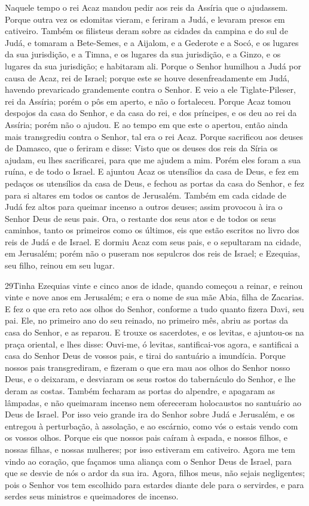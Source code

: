 Naquele tempo o rei Acaz mandou pedir aos reis da Assíria que o
ajudassem. Porque outra vez os edomitas vieram, e feriram a
Judá, e levaram presos em cativeiro. Também os filisteus
deram sobre as cidades da campina e do sul de Judá, e tomaram a
Bete-Semes, e a Aijalom, e a Gederote e a Socó, e os lugares da sua
jurisdição, e a Timna, e os lugares da sua jurisdição, e a Ginzo, e
os lugares da sua jurisdição; e habitaram ali. Porque o
Senhor humilhou a Judá por causa de Acaz, rei de Israel; porque este
se houve desenfreadamente em Judá, havendo prevaricado grandemente
contra o Senhor. E veio a ele Tiglate-Pileser, rei da
Assíria; porém o pôs em aperto, e não o fortaleceu. Porque
Acaz tomou despojos da casa do Senhor, e da casa do rei, e dos
príncipes, e os deu ao rei da Assíria; porém não o ajudou. E
ao tempo em que este o apertou, então ainda mais transgrediu contra
o Senhor, tal era o rei Acaz. Porque sacrificou aos deuses de
Damasco, que o feriram e disse: Visto que os deuses dos reis da
Síria os ajudam, eu lhes sacrificarei, para que me ajudem a mim.
Porém eles foram a sua ruína, e de todo o Israel. E ajuntou
Acaz os utensílios da casa de Deus, e fez em pedaços os utensílios
da casa de Deus, e fechou as portas da casa do Senhor, e fez para si
altares em todos os cantos de Jerusalém. Também em cada
cidade de Judá fez altos para queimar incenso a outros deuses; assim
provocou à ira o Senhor Deus de seus pais. Ora, o restante
dos seus atos e de todos os seus caminhos, tanto os primeiros como
os últimos, eis que estão escritos no livro dos reis de Judá e de
Israel. E dormiu Acaz com seus pais, e o sepultaram na
cidade, em Jerusalém; porém não o puseram nos sepulcros dos reis de
Israel; e Ezequias, seu filho, reinou em seu lugar.

\medskip

\lettrine{29} Tinha Ezequias vinte e cinco anos de idade,
quando começou a reinar, e reinou vinte e nove anos em Jerusalém; e
era o nome de sua mãe Abia, filha de Zacarias. E fez o que era
reto aos olhos do Senhor, conforme a tudo quanto fizera Davi, seu
pai. Ele, no primeiro ano do seu reinado, no primeiro mês, abriu
as portas da casa do Senhor, e as reparou. E trouxe os
sacerdotes, e os levitas, e ajuntou-os na praça oriental, e lhes
disse: Ouvi-me, ó levitas, santificai-vos agora, e santificai a casa
do Senhor Deus de vossos pais, e tirai do santuário a imundícia.
Porque nossos pais transgrediram, e fizeram o que era mau aos
olhos do Senhor nosso Deus, e o deixaram, e desviaram os seus rostos
do tabernáculo do Senhor, e lhe deram as costas. Também fecharam
as portas do alpendre, e apagaram as lâmpadas, e não queimaram
incenso nem ofereceram holocaustos no santuário ao Deus de Israel.
Por isso veio grande ira do Senhor sobre Judá e Jerusalém, e os
entregou à perturbação, à assolação, e ao escárnio, como vós o
estais vendo com os vossos olhos. Porque eis que nossos pais
caíram à espada, e nossos filhos, e nossas filhas, e nossas
mulheres; por isso estiveram em cativeiro. Agora me tem vindo
ao coração, que façamos uma aliança com o Senhor Deus de Israel,
para que se desvie de nós o ardor da sua ira. Agora, filhos
meus, não sejais negligentes; pois o Senhor vos tem escolhido para
estardes diante dele para o servirdes, e para serdes seus ministros
e queimadores de incenso.

